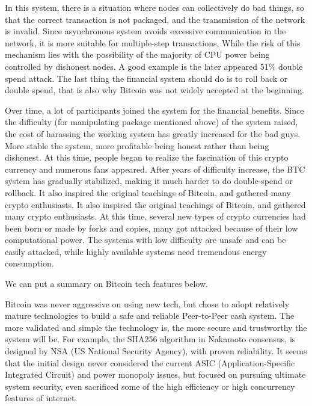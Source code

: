 \begin{flushleft}
    In this system, there is a situation where nodes can collectively do bad things, so that the correct transaction is not packaged, and the transmission of the network is invalid. Since asynchronous system avoids excessive communication in the network, it is more suitable for multiple-step transactions, While the risk of this mechanism lies with the possibility of the majority of CPU power being controlled by dishonest nodes. A good example is the later appeared $51\%$ double spend attack. The last thing the financial system should do is to roll back or double spend, that is also why Bitcoin was not widely accepted at the beginning.
\end{flushleft}
\begin{flushleft}
    Over time, a lot of participants joined the system for the financial benefits. Since the difficulty (for manipulating package mentioned above) of the system raised, the cost of harassing the working system has greatly increased for the bad guys. More stable the system, more profitable being honest rather than being dishonest. At this time, people began to realize the fascination of this crypto currency and numerous fans appeared. After years of difficulty increase, the BTC system has gradually stabilized, making it much harder to do double-spend or rollback. It also inspired the original teachings of Bitcoin, and gathered many crypto enthusiasts. It also inspired the original teachings of Bitcoin, and gathered many crypto enthusiasts. At this time, several new types of crypto currencies had been born or made by forks and copies, many got attacked because of their low computational power. The systems with low difficulty are unsafe and can be easily attacked, while highly available systems need tremendous energy consumption.
\end{flushleft}
\begin{flushleft}
    We can put a summary on Bitcoin tech features below.
\end{flushleft}
\begin{flushleft}
    Bitcoin was never aggressive on using new tech, but chose to adopt relatively mature technologies to build a safe and reliable Peer-to-Peer cash system. The more validated and simple the technology is, the more secure and trustworthy the system will be. For example, the SHA256 algorithm in Nakamoto consensus, is designed by NSA (US National Security Agency), with proven reliability. It seems that the initial design never considered the current ASIC (Application-Specific Integrated Circuit) and power monopoly issues, but focused on pursuing ultimate system security, even sacrificed some of the high efficiency or high concurrency features of internet.
\end{flushleft}
